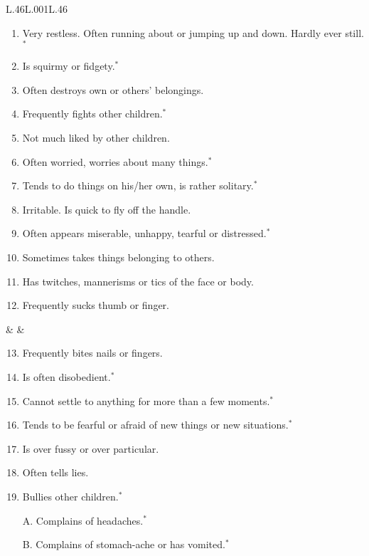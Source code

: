

\begin{table}[ht!]
\caption{Behavioural screening scales in the BCS and MCS five-year surveys}\label{tab:scales}
\centering{} \footnotesize
\begin{tabular}{L{.46\linewidth}L{.001\linewidth}L{.46\linewidth}}
\toprule
{} \\[-1.8em]
\begin{enumerate}
\item Very restless. Often running about or jumping up and down. Hardly ever still.$^*$
\item Is squirmy or fidgety.$^*$
\item Often destroys own or others' belongings.
\item Frequently fights other children.$^*$
\item Not much liked by other children.
\item Often worried, worries about many things.$^*$
\item Tends to do things on his/her own, is rather solitary.$^*$
\item Irritable. Is quick to fly off the handle.
\item Often appears miserable, unhappy, tearful or distressed.$^*$
\item Sometimes takes things belonging to others.
\item Has twitches, mannerisms or tics of the face or body.
\item Frequently sucks thumb or finger.
\end{enumerate}
& &
\begin{enumerate}\setcounter{enumi}{12}
\item Frequently bites nails or fingers.
\item Is often disobedient.$^*$
\item Cannot settle to anything for more than a few moments.$^*$
\item Tends to be fearful or afraid of new things or new situations.$^*$
\item Is over fussy or over particular.
\item Often tells lies.
\item Bullies other children.$^*$
\item[A.] Complains of headaches.$^*$
\item[B.] Complains of stomach-ache or has vomited.$^*$

\end{enumerate}
\end{tabular}
\end{table}
